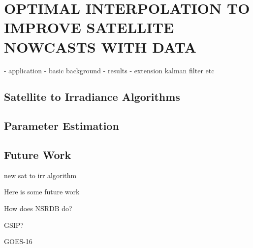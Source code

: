 \chapter{OPTIMAL INTERPOLATION TO IMPROVE SATELLITE NOWCASTS WITH DATA}
\label{chap:satoi}

- application
- basic background
- results
- extension kalman filter etc

\section{Satellite to Irradiance Algorithms}

\section{Parameter Estimation}

\section{Future Work}

new sat to irr algorithm

Here is some future work

How does NSRDB do?

GSIP?

GOES-16
